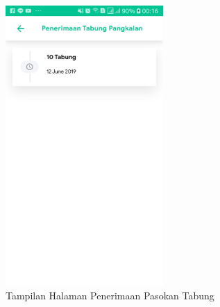 	\begin{figure}[H]
		\center
		\includegraphics [width = 6cm]{gambar/android/penerimaan}
		\caption{Tampilan Halaman Penerimaan Pasokan Tabung}
		\label{tampilanPenerimaanPangkalan}
	\end{figure}

